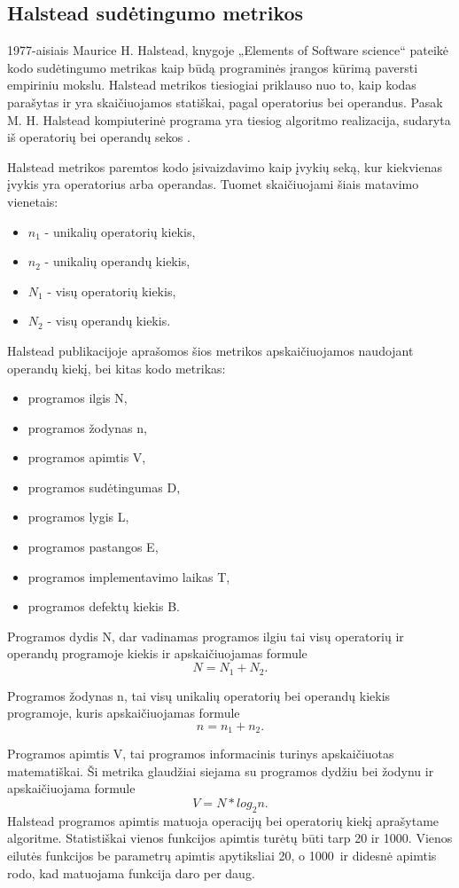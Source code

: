 \documentclass{VUMIFPSbakalaurinis}
\begin{document}
\subsection{Halstead sudėtingumo metrikos}
1977-aisiais Maurice H. Halstead, knygoje „Elements of Software science“ pateikė kodo sudėtingumo metrikas kaip būdą programinės įrangos kūrimą paversti empiriniu mokslu. Halstead metrikos tiesiogiai priklauso nuo to, kaip kodas parašytas ir yra skaičiuojamos statiškai, pagal operatorius bei operandus. Pasak M. H. Halstead kompiuterinė programa yra tiesiog algoritmo realizacija, sudaryta iš operatorių bei operandų sekos \cite{Halstead:1977:ESS:540137}.

Halstead metrikos paremtos kodo įsivaizdavimo kaip įvykių seką, kur kiekvienas įvykis yra operatorius arba operandas. Tuomet skaičiuojami šiais matavimo vienetais:
\begin{itemize}  
\item[]\(n_1\) - unikalių operatorių kiekis,
\item[]\(n_2\) - unikalių operandų kiekis,
\item[]\(N_1\) - visų operatorių kiekis,
\item[]\(N_2\) - visų operandų kiekis.
\end{itemize} 
Halstead publikacijoje aprašomos šios metrikos apskaičiuojamos naudojant operandų kiekį, bei kitas kodo metrikas:
\begin{itemize}  
\item[] programos ilgis N,
\item[] programos žodynas n,
\item[] programos apimtis V,
\item[] programos sudėtingumas D,
\item[] programos lygis L,
\item[] programos pastangos E,
\item[] programos implementavimo laikas T,
\item[] programos defektų kiekis B.
\end{itemize} 

Programos dydis N, dar vadinamas programos ilgiu tai visų operatorių ir operandų programoje kiekis ir apskaičiuojamas formule\[N = N_1 + N_2.\]

Programos žodynas n, tai visų unikalių operatorių bei operandų kiekis programoje, kuris apskaičiuojamas formule  \[n =  n_1 + n_2.\]

Programos apimtis V, tai programos informacinis turinys apskaičiuotas matematiškai. Ši metrika glaudžiai siejama su programos dydžiu bei žodynu ir apskaičiuojama formule \[V = N * log_2n.\] Halstead programos apimtis matuoja operacijų bei operatorių kiekį aprašytame algoritme. Statistiškai vienos funkcijos apimtis turėtų būti tarp 20 ir 1000. Vienos eilutės funkcijos be parametrų apimtis apytiksliai 20, o 1000 ir didesnė apimtis rodo, kad matuojama funkcija daro per daug.
\end{document}
